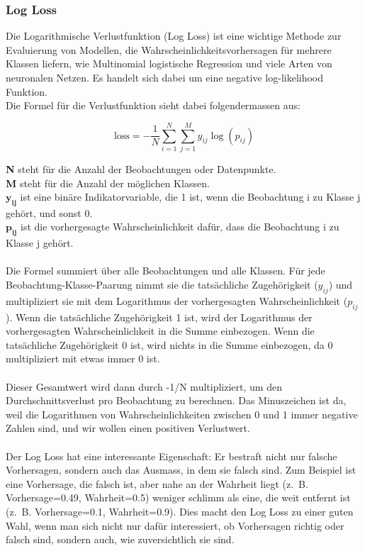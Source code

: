 \documentclass{article}
\begin{document}
\subsubsection{Log Loss}

Die Logarithmische Verlustfunktion (Log Loss) ist eine wichtige Methode zur Evaluierung von Modellen, die Wahrscheinlichkeitsvorhersagen für mehrere Klassen liefern, wie Multinomial logistische Regression und viele Arten von neuronalen Netzen. Es handelt sich dabei um eine negative log-likelihood Funktion.\\
Die Formel für die Verlustfunktion sieht dabei folgendermassen aus:

\[
\text{loss} = -\frac{1}{N} \sum_{i=1}^{N} \sum_{j=1}^{M} y_{ij} \log(p_{ij})
\]

\noindent
\textbf{N} steht für die Anzahl der Beobachtungen oder Datenpunkte.\\
\textbf{M} steht für die Anzahl der möglichen Klassen.\\
$\mathbf{y_{ij}}$ ist eine binäre Indikatorvariable, die 1 ist, wenn die Beobachtung i zu Klasse j gehört, und sonst 0.\\
$\mathbf{p_{ij}}$ ist die vorhergesagte Wahrscheinlichkeit dafür, dass die Beobachtung i zu Klasse j gehört.\\\\

\noindent
Die Formel summiert über alle Beobachtungen und alle Klassen. Für jede Beobachtung-Klasse-Paarung nimmt sie die tatsächliche Zugehörigkeit ($y_{ij}$) und multipliziert sie mit dem Logarithmus der vorhergesagten Wahrscheinlichkeit ($p_{ij}$). Wenn die tatsächliche Zugehörigkeit 1 ist, wird der Logarithmus der vorhergesagten Wahrscheinlichkeit in die Summe einbezogen. Wenn die tatsächliche Zugehörigkeit 0 ist, wird nichts in die Summe einbezogen, da 0 multipliziert mit etwas immer 0 ist.\\\\
Dieser Gesamtwert wird dann durch -1/N multipliziert, um den Durchschnittsverlust pro Beobachtung zu berechnen. Das Minuszeichen ist da, weil die Logarithmen von Wahrscheinlichkeiten zwischen 0 und 1 immer negative Zahlen sind, und wir wollen einen positiven Verlustwert.\\\\
Der Log Loss hat eine interessante Eigenschaft: Er bestraft nicht nur falsche Vorhersagen, sondern auch das Ausmass, in dem sie falsch sind. Zum Beispiel ist eine Vorhersage, die falsch ist, aber nahe an der Wahrheit liegt (z. B. Vorhersage=0.49, Wahrheit=0.5) weniger schlimm als eine, die weit entfernt ist (z. B. Vorhersage=0.1, Wahrheit=0.9). Dies macht den Log Loss zu einer guten Wahl, wenn man sich nicht nur dafür interessiert, ob Vorhersagen richtig oder falsch sind, sondern auch, wie zuversichtlich sie sind.
\end{document}
